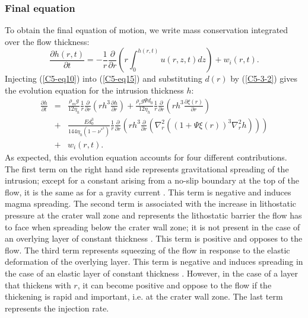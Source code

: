 \subsubsection{Final equation}
\label{C5-Final_Equation}

To obtain  the final  equation of motion,  we write  mass conservation
integrated over the flow thickness:
\begin{equation}
  \frac{\partial h(r,t)}{\partial t} = -\frac{1}{r} \frac{\partial}{\partial r} \left( r \int_{0}^{h(r,t)} u(r,z,t) dz\right ) + w_i(r,t) .
  \label{C5-eq15}
\end{equation}
Injecting  (\ref{C5-eq10})   into  (\ref{C5-eq15})   and  substituting
$d(r)$  by (\ref{C5-3-2})  gives  the evolution  equation for  the
intrusion thickness $h$:
\begin{eqnarray}
  \frac{\partial h}{\partial t} &=&\frac{\rho_{m}g}{12 \eta_h} \frac{1}{r} \frac{\partial}{\partial r}\left (r h^{3} \frac{\partial h}{\partial r} \right)+ \frac{\rho_rg\Psi d_0}{12 \eta_h} \frac{1}{r} \frac{\partial}{\partial r}\left ( r h^{3} \frac{\partial \xi(r)}{\partial r}\right ) \nonumber \\
                                &+&\frac{E       d_0^{3}}{144\eta_h
                                    (1-\nu^*^{2})}\frac{1}{r}\frac{\partial}{\partial
                                    r}\left       (      r       h^{3}
                                    \frac{\partial}{\partial        r}
                                    \left(\nabla^{2}_{r}      ((1+\Psi
                                    \xi(r))^{3}\nabla^{2}_{r}h )\right)\right )\nonumber\\
                                &+& w_i(r,t).
                                    \label{C5-eq16}
\end{eqnarray}
As  expected,  this evolution  equation  accounts  for four  different
contributions.   The first  term  on the  right  hand side  represents
gravitational  spreading  of  the  intrusion; except  for  a  constant
arising from a no-slip boundary at the top of the flow, it is the same
as for a gravity current  \citep{Huppert:1982a}. This term is negative
and induces  magma spreading. The  second term is associated  with the
increase  in  lithostatic  pressure  at   the  crater  wall  zone  and
represents the lithostatic barrier the flow has to face when spreading
below  the crater  wall zone;  it is  not present  in the  case of  an
overlying  layer of  constant thickness  \citep{Michaut:2011kg}.  This
term is positive  and opposes to the flow.  The  third term represents
squeezing of  the flow in response  to the elastic deformation  of the
overlying layer.  This  term is negative and induces  spreading in the
case    of     an    elastic     layer    of     constant    thickness
\citep{Michaut:2011kg}. However, in the case  of a layer that thickens
with  $r$, it  can  become positive  and  oppose to  the  flow if  the
thickening is rapid  and important, i.e. at the crater  wall zone. The
last term represents the injection rate.

